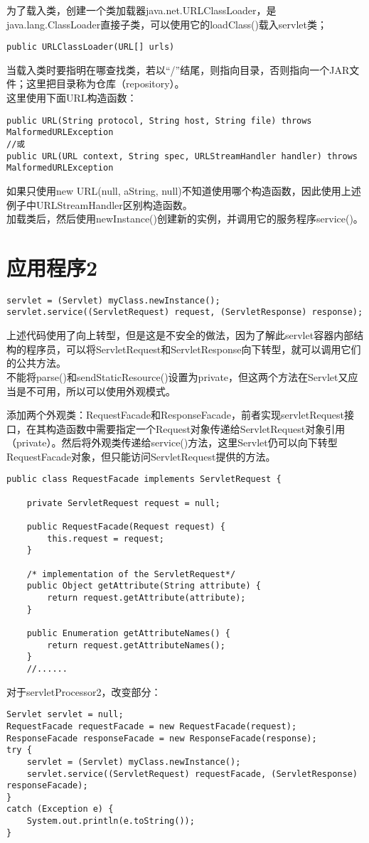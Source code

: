 为了载入类，创建一个类加载器java.net.URLClassLoader，是java.lang.ClassLoader直接子类，可以使用它的loadClass()载入servlet类；
\begin{lstlisting}
public URLClassLoader(URL[] urls)
\end{lstlisting}
当载入类时要指明在哪查找类，若以“/”结尾，则指向目录，否则指向一个JAR文件；这里把目录称为仓库（repository）。\\
这里使用下面URL构造函数：
\begin{lstlisting}
public URL(String protocol, String host, String file) throws MalformedURLException
//或
public URL(URL context, String spec, URLStreamHandler handler) throws MalformedURLException
\end{lstlisting}
如果只使用new URL(null, aString, null)不知道使用哪个构造函数，因此使用上述例子中URLStreamHandler区别构造函数。\\
加载类后，然后使用newInstance()创建新的实例，并调用它的服务程序service()。
\section{应用程序2}
\begin{lstlisting}
servlet = (Servlet) myClass.newInstance();
servlet.service((ServletRequest) request, (ServletResponse) response);
\end{lstlisting}
上述代码使用了向上转型，但是这是不安全的做法，因为了解此servlet容器内部结构的程序员，可以将ServletRequest和ServletResponse向下转型，就可以调用它们的公共方法。\\
不能将parse()和sendStaticResource()设置为private，但这两个方法在Servlet又应当是不可用，所以可以使用外观模式。
\par 添加两个外观类：RequestFacade和ResponseFacade，前者实现servletRequest接口，在其构造函数中需要指定一个Request对象传递给ServletRequest对象引用（private）。然后将外观类传递给service()方法，这里Servlet仍可以向下转型RequestFacade对象，但只能访问ServletRequest提供的方法。
\begin{lstlisting}
public class RequestFacade implements ServletRequest {
	
	private ServletRequest request = null;
	
	public RequestFacade(Request request) {
		this.request = request;
	}
	
	/* implementation of the ServletRequest*/
	public Object getAttribute(String attribute) {
		return request.getAttribute(attribute);
	}
	
	public Enumeration getAttributeNames() {
		return request.getAttributeNames();
	}
	//......	
\end{lstlisting}
对于servletProcessor2，改变部分：
\begin{lstlisting}
Servlet servlet = null;
RequestFacade requestFacade = new RequestFacade(request);
ResponseFacade responseFacade = new ResponseFacade(response);
try {
	servlet = (Servlet) myClass.newInstance();
	servlet.service((ServletRequest) requestFacade, (ServletResponse) responseFacade);
}
catch (Exception e) {
	System.out.println(e.toString());
}
\end{lstlisting}